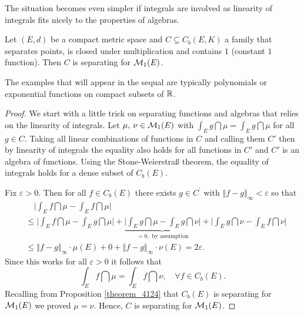 The situation becomes even simpler if integrals are involved as linearity of integrals fits nicely to the properties of algebras.
\begin{llemma}
\begin{corollary}\label{cor_514}
	Let $(E,d)$ be a compact metric space and $C \subseteq C_b(E,K)$ a family that separates points, is closed under multiplication and contains $1$ (constant $1$ function). Then $C$ is separating for $\mathcal{M}_1(E)$.
\end{corollary}
\end{llemma}
The examples that will appear in the sequal are typically polynomials or exponential functions on compact subsets of $\mathbb{R}$.
\begin{proof}[Proof]
	We start with a little trick on separating functions and algebras that relies on the linearity of integrals. Let $\mu,\: \nu \in \mathcal{M}_1(E)$ with $\int_E g \dint \mu = \int_E g \dint \mu$ for all $g \in C$. Taking all linear combinations of functions in $C$ and calling them $C'$ then by linearity of integrals the equality also holds for all functions in $C'$ and $C'$ is an algebra of functions. Using the Stone-Weierstra\ss{} theorem, the equality of integrals holds for a dense subset of $C_b(E)$.
	\smallskip
	
	Fix $\varepsilon>0$. Then for all $f \in C_b(E)$ there exists $g \in C^{\prime}$ with $\left\Vert f - g \right\Vert_{\infty} < \varepsilon$ so that 
	\begin{align*}
		&\quad\Big| \int_E f \dint  \mu - \int_E f \dint \mu \Big|  \\ 
		&\leq \Big| \int_E f \dint \mu - \int_E g \dint \mu \Big| + \underbrace{\Big| \int_E g \dint \mu - \int_E g \dint \nu \Big|}_{= 0, \text{ by assumption}} + \Big| \int_E g \dint \nu - \int_E f \dint \nu \Big| \\
		&\leq \left\Vert f - g \right\Vert_{\infty} \cdot \mu(E) + 0 + \left\Vert f - g \right\Vert_{\infty} \cdot \nu(E) = 2 \varepsilon.
	\end{align*}
	Since this works for all $\varepsilon > 0$ it follows that $$\int_E f \dint \mu = \int_E f \dint \nu,\quad \forall f\in C_b(E).$$ Recalling from Proposition \ref{theorem_4124} that $C_b(E)$ is separating for $\mathcal{M}_1(E)$ we proved $\mu = \nu$. Hence, $C$ is separating for $\mathcal{M}_1(E)$.
\end{proof}

